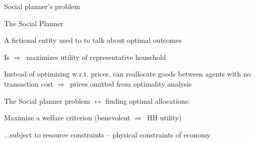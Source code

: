 \documentclass{beamer}
\newcommand{\tb}[1]{{\color{blue}{\textbf{#1}}}}
\newenvironment{mytemize}
{\vfill\itemize[nolistsep,itemsep=\fill,label=\color{blue}{$\triangleright$}]}
  {\enditemize}
\newcommand{\rarr}{$\Rightarrow$\ }
\begin{document}
\begin{frame}{Social planner's problem}

\begin{mytemize}
\item The Social Planner
\begin{mytemize}
\item A fictional entity used to  to talk about optimal outcomes
\item Is \tb{benevolent} \rarr maximizes utility of representative household
\item Instead of optimizing w.r.t. prices, can reallocate goods between agents with no transaction cost 
  \rarr prices omitted from optimality analysis
\end{mytemize}
\item  The Social planner problem $\leftrightarrow$ finding optimal allocations:
\begin{mytemize}
\item Maximize a welfare criterion (benevolent \rarr HH utility)
\item ...subject to resource constraints -- physical constraints of economy
\end{mytemize}
\end{mytemize}


\end{frame}
\end{document}
